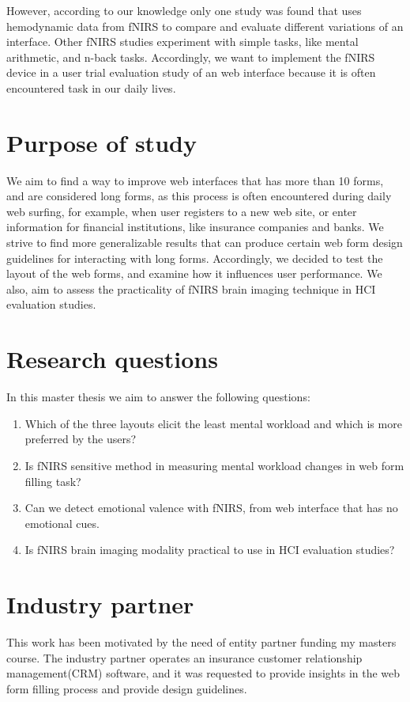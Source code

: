 \documentclass[a4paper]{report}
\begin{document}
	However, according to our knowledge only one study was found\cite{peck2013using} that uses hemodynamic data from fNIRS to compare and evaluate different variations of an interface. Other fNIRS studies experiment with simple tasks, like mental arithmetic, and n-back tasks. Accordingly, we want to implement the fNIRS device in a user trial evaluation study of an web interface because it is often encountered task in our daily lives. 
	
	\section{Purpose of study}
		 We aim to find a way to improve web interfaces that has more than 10 forms, and are considered long forms, as this process is often encountered during daily web surfing, for example, when user registers to a new web site, or enter information for financial institutions, like insurance companies and banks. We strive to find more generalizable results that can produce certain web form design guidelines for interacting with long forms. Accordingly, we decided to test the layout of the web forms, and examine how it influences user performance. We also, aim to assess the practicality of fNIRS brain imaging technique in HCI evaluation studies.
	\section{Research questions}
		In this master thesis we aim to answer the following questions:
		\begin{enumerate}
			\itemsep0em
			\item Which of the three layouts elicit the least mental workload and which is more preferred by the users?
			\item Is fNIRS sensitive method in measuring mental workload changes in web form filling task? 
			\item Can we detect emotional valence with fNIRS, from web interface that has no emotional cues.
			\item Is fNIRS brain imaging modality practical to use in HCI evaluation studies?
		\end{enumerate}		
	\section{Industry partner}
		This work has been motivated by the need of entity partner funding my masters course. The industry partner operates an insurance customer relationship management(CRM) software, and it was requested to provide insights in the web form filling process and provide design guidelines.	
\end{document}
